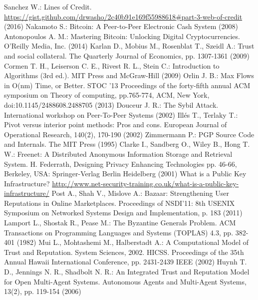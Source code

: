 \begin{thebibliography}{40}
   Sanchez W.: Lines of Credit. \url{https://gist.github.com/drwasho/2c40b91e169f55988618#part-3-web-of-credit} (2016)
   Nakamoto S.: Bitcoin: A Peer-to-Peer Electronic Cash System (2008)
   Antonopoulos A. M.: Mastering Bitcoin: Unlocking Digital Cryptocurrencies. O'Reilly Media, Inc. (2014)
   Karlan D., Mobius M., Rosenblat T., Szeidl A.: Trust and social collateral. The Quarterly Journal of Economics, pp.
   1307-1361 (2009)
   Cormen T. H., Leiserson C. E., Rivest R. L., Stein C.: Introduction to Algorithms (3rd ed.). MIT Press and McGraw-Hill
   (2009)
   Orlin J. B.: Max Flows in O(nm) Time, or Better. STOC '13 Proceedings of the forty-fifth annual ACM symposium on Theory
   of computing, pp.765-774, ACM, New York, doi:10.1145/2488608.2488705 (2013)
   Douceur J. R.: The Sybil Attack. International workshop on Peer-To-Peer Systems (2002)
   Ill\'es T., Terlaky T.: Pivot versus interior point methods: Pros and cons. European Journal of Operational Research,
   140(2), 170-190 (2002)
   Zimmermann P.: PGP Source Code and Internals. The MIT Press (1995)
   Clarke I., Sandberg O., Wiley B., Hong T. W.: Freenet: A Distributed Anonymous Information Storage and
   Retrieval System. H. Federrath, Designing Privacy Enhancing Technologies pp. 46-66, Berkeley, USA: Springer-Verlag
   Berlin Heidelberg (2001)
   What is a Public Key Infrastructure? \url{http://www.net-security-training.co.uk/what-is-a-public-key-infrastructure/}
   Post A., Shah V., Mislove A.: Bazaar: Strengthening User Reputations in Online Marketplaces. Proceedings of NSDI'11:
   8th USENIX Symposium on Networked Systems Design and Implementation, p. 183 (2011)
   Lamport L., Shostak R., Pease M.: The Byzantine Generals Problem. ACM Transactions on Programming Languages and Systems
   (TOPLAS) 4.3, pp. 382-401 (1982)
   Mui L., Mohtashemi M., Halberstadt A.: A Computational Model of Trust and Reputation. System Sciences, 2002. HICSS.
   Proceedings of the 35th Annual Hawaii International Conference, pp. 2431-2439 IEEE (2002)
   Huynh T. D., Jennings N. R., Shadbolt N. R.: An Integrated Trust and Reputation Model for Open Multi-Agent Systems.
   Autonomous Agents and Multi-Agent Systems, 13(2), pp. 119-154 (2006)

\end{thebibliography}
